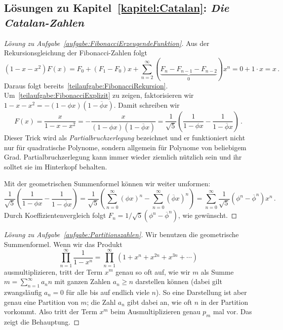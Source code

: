 \subsection*{Lösungen zu Kapitel~\ref{kapitel:Catalan}: \emph{Die Catalan-Zahlen}}

\begin{proof}[Lösung zu Aufgabe~\ref{aufgabe:FibonacciErzeugendeFunktion}]
	Aus der Rekursionsgleichung der Fibonacci-Zahlen folgt
	\begin{equation*}
		(1-x-x^2)F(x)=F_0+(F_1-F_0)x+\sum_{n=2}^\infty (\underbrace{F_n-F_{n-1}-F_{n-2}}_{0})x^n=0+1\cdot x=x\,.
	\end{equation*}
	Daraus folgt bereits~\ref{teilaufgabe:FibonacciRekursion}. Um~\ref{teilaufgabe:FibonacciExplizit} zu zeigen, faktorisieren wir $1-x-x^2=-(1-\phi x)(1-\overline{\phi}x)$. Damit schreiben wir
	\begin{equation*}
		F(x)=\frac{x}{1-x-x^2}=-\frac{x}{(1-\phi x)(1-\overline{\phi}x)}=\frac{1}{\sqrt{5}}\left(\frac{1}{1-\phi x}-\frac{1}{1-\overline{\phi}x}\right)\,.
	\end{equation*}
	Dieser Trick wird als \emph{Partialbruchzerlegung} bezeichnet und er funktioniert nicht nur für quadratische Polynome, sondern allgemein für Polynome von beliebigem Grad. Partialbruchzerlegung kann immer wieder ziemlich nützlich sein und ihr solltet sie im Hinterkopf behalten.
	
	Mit der geometrischen Summenformel können wir weiter umformen:
	\begin{equation*}
		\frac{1}{\sqrt{5}}\left(\frac{1}{1-\phi x}-\frac{1}{1-\overline{\phi}x}\right)=\frac{1}{\sqrt{5}}\left(\sum_{n=0}^\infty(\phi x)^n-\sum_{n=0}^\infty (\overline{\phi}x)^n\right)=\sum_{n=0}^\infty \frac{1}{\sqrt{5}}\left(\phi^n-\overline{\phi}^n\right)x^n\,.
	\end{equation*}
	Durch Koeffizientenvergleich folgt $F_n=1/\sqrt{5}(\phi^n-\overline{\phi}^n)$, wie gewünscht.
\end{proof}
\begin{proof}[Lösung zu Aufgabe~\ref{aufgabe:Partitionszahlen}]
	Wir benutzen die geometrische Summenformel. Wenn wir das Produkt
	\begin{equation*}
		\prod_{n=1}^{\infty}\frac{1}{1-x^n}=\prod_{n=1}^{\infty}\left(1+x^n+x^{2n}+x^{3n}+\dotsb\right)
	\end{equation*}
	ausmultiplizieren, tritt der Term $x^m$ genau so oft auf, wie wir $m$ als Summe $m=\sum_{n=1}^\infty a_nn$ mit ganzen Zahlen $a_n\geqslant n$ darstellen können (dabei gilt zwangsläufig $a_n=0$ für alle bis auf endlich viele $n$). So eine Darstellung ist aber genau eine Partition von $m$; die Zahl $a_n$ gibt dabei an, wie oft $n$ in der Partition vorkommt. Also tritt der Term $x^m$ beim Ausmultiplizieren genau $p_m$ mal vor. Das zeigt die Behauptung.
\end{proof}
